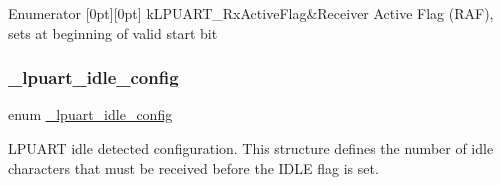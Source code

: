 \begin{DoxyEnumFields}{Enumerator}
[0pt][0pt]{}\mbox{\label{group__lpuart__driver_gga24bb7ca3f894fe5ff55b9f38bec16c89a1f14711a74db1cc141b5c2627ee4c799}} 
k\+L\+P\+U\+A\+R\+T\+\_\+\+Rx\+Active\+Flag&Receiver Active Flag (R\+AF), sets at beginning of valid start bit \\
\hline

\end{DoxyEnumFields}
\mbox{\label{group__lpuart__driver_ga13c97cefe85629e606de5281d4eef25b}} 
\subsubsection{\texorpdfstring{\_lpuart\_idle\_config}{\_lpuart\_idle\_config}}
{\footnotesize\ttfamily enum \mbox{\hyperlink{group__lpuart__driver_ga13c97cefe85629e606de5281d4eef25b}{\+\_\+lpuart\+\_\+idle\+\_\+config}}}



L\+P\+U\+A\+RT idle detected configuration. This structure defines the number of idle characters that must be received before the I\+D\+LE flag is set. 

